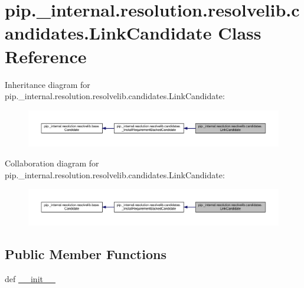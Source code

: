 \hypertarget{classpip_1_1__internal_1_1resolution_1_1resolvelib_1_1candidates_1_1LinkCandidate}{}\section{pip.\+\_\+internal.\+resolution.\+resolvelib.\+candidates.\+Link\+Candidate Class Reference}
\label{classpip_1_1__internal_1_1resolution_1_1resolvelib_1_1candidates_1_1LinkCandidate}


Inheritance diagram for pip.\+\_\+internal.\+resolution.\+resolvelib.\+candidates.\+Link\+Candidate\+:
\nopagebreak
\begin{figure}[H]
\begin{center}
\leavevmode
\includegraphics[width=350pt]{classpip_1_1__internal_1_1resolution_1_1resolvelib_1_1candidates_1_1LinkCandidate__inherit__graph}
\end{center}
\end{figure}


Collaboration diagram for pip.\+\_\+internal.\+resolution.\+resolvelib.\+candidates.\+Link\+Candidate\+:
\nopagebreak
\begin{figure}[H]
\begin{center}
\leavevmode
\includegraphics[width=350pt]{classpip_1_1__internal_1_1resolution_1_1resolvelib_1_1candidates_1_1LinkCandidate__coll__graph}
\end{center}
\end{figure}
\subsection*{Public Member Functions}
\begin{DoxyCompactItemize}
\item 
def \hyperlink{classpip_1_1__internal_1_1resolution_1_1resolvelib_1_1candidates_1_1LinkCandidate_ac41cf0342eead083324f802f0b9f016c}{\+\_\+\+\_\+init\+\_\+\+\_\+}
\end{DoxyCompactItemize}
